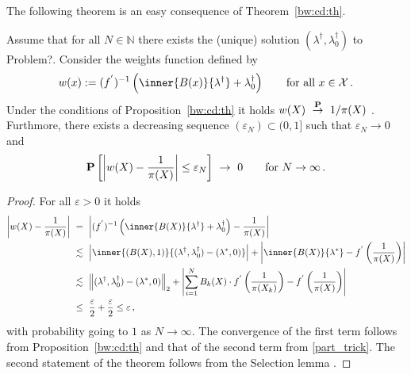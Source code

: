 The following theorem is an easy consequence of Theorem~\ref{bw:cd:th}.
\begin{ftheorem}
  \label{aa:weights:th}
  Assume that for all $N\in\mathbb{N}$ there exists the (unique) solution $(\lambda^\dagger,\lambda_0^\dagger)$
  to Problem?.
  Consider the weights function defined by
  \begin{gather}
    w(x)
    :=
    (
    f^{'}
    )^{-1}
    \left( 
      \inner{B(x)}{\lambda^\dagger}
      +
      \lambda_0^\dagger
    \right)
    \qquad
    \text{for all}\ 
    x\in\mathcal{X}
    \,.
  \end{gather}
  Under the conditions of Proposition~\ref{bw:cd:th} 
  it holds
  $w(X)\ 
  \overset{\P}{\to}
  \ 
  1/\pi(X)
  $
  .
  Furthmore, there exists a decreasing sequence $(\varepsilon_N)\subset(0,1]$ such that $\varepsilon_N\to 0$ and 
  \begin{gather}
    \P
    \left[ 
  \left| 
  w(X)
  -
  \frac{1}{\pi(X)}
  \right|
    \le
    \varepsilon_N
    \right]
  \  
  \to
  \  
  0
  \qquad
  \text{for}
  \ 
  N\to\infty
  \,.
  \end{gather}
\end{ftheorem}
\begin{proof}
  For all $\varepsilon>0$ it holds
\begin{align}
  \begin{split}
  \left| 
  w(X)
  -
  \frac{1}{\pi(X)}
  \right|
  &
  \ 
  =
  \ 
  \left| 
  (f^{'})^{-1}
  \left( 
    \inner{B(X)}
    {\lambda^\dagger}
    +
    \lambda_0^\dagger
  \right)
  -
  \frac{1}{\pi(X)}
  \right|
  \\
  &
  \ 
  \lesssim
  \ 
  \left| 
    \inner{(B(X),1)}
    {
      (\lambda^\dagger,\lambda_0^\dagger)
      -
      (\lambda^*,0)
    }
  \right|
  +
  \left| 
    \inner{B(X)}
    {
      \lambda^*
      }
    -
    f^{'}
    \left( 
  \frac{1}{\pi(X)}
    \right)
  \right|
  \\
  &
  \ 
  \lesssim
  \ 
  \norm{
      (\lambda^\dagger,\lambda_0^\dagger)
      -
      (\lambda^*,0)
}_2
  +
  \left| 
  \sum_{i=1}^{N} 
  B_k(X)
  \cdot
    f^{'}
    \left( 
  \frac{1}{\pi(X_k)}
    \right)
    -
    f^{'}
    \left( 
  \frac{1}{\pi(X)}
    \right)
  \right|
  \\
  &
  \ 
  \le
  \ 
  \frac{\varepsilon}{2}
+
  \frac{\varepsilon}{2}
  \le
  \varepsilon
  \,,
\end{split}
\end{align}
with probability going to $1$ as $N\to\infty$.
The convergence of the first term follows from Proposition~\ref{bw:cd:th} and that of the second term from \eqref{part_trick}.
The second statement of the theorem follows from the Selection lemma
\cite[A.1.4.]{Steinwart2008}.
\end{proof}

